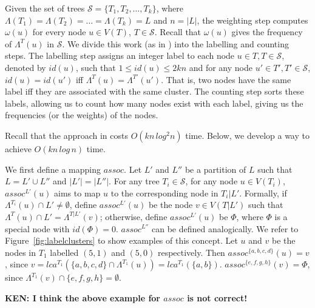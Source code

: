 \documentclass[final,1p,times]{elsarticle}
\newcommand{\leafset}{\Lambda}
\newcommand{\weight}{\omega}
\begin{document}
    Given the set of trees $\mathcal{S} = \{T_1, T_2, \ldots, T_k\}$, where $\leafset(T_1) = \leafset(T_2) = \ldots = \leafset(T_k) = L$ and $n = |L|$, the weighting step computes $\weight(u)$ for every node $u \in V(T)$, $T \in \mathcal{S}$. Recall that $\weight(u)$ gives the frequency of $\leafset^T(u)$ in $\mathcal{S}$. We divide this work (as in \cite{gawrychowski2017faster}) into the labelling and counting steps. The labelling step assigns an integer label to each node $u \in T, T \in \mathcal{S}$, denoted by $id(u)$, such that $1 \leq id(u) \leq 2kn$ and for any node $u' \in T', T' \in \mathcal{S}$, $id(u) = id(u')$ iff $\leafset^T(u) = \leafset^{T'}(u')$. That is, two nodes have the same label iff they are associated with the same cluster. The counting step sorts these labels, allowing us to count how many nodes exist with each label, giving us the frequencies (or the weights) of the nodes.

    Recall that the approach in \cite{gawrychowski2017faster} costs $O(kn\,log^2n)$ time. Below, we develop a way to achieve $O(kn\,log\,n)$ time.

    We first define a mapping $assoc$. Let $L'$ and $L''$ be a partition of $L$ such that $L = L' \cup L''$ and $|L'|=|L''|$.
    For any tree $T_i \in \mathcal{S}$, for any node $u \in V(T_i)$, $assoc^{L'}(u)$ aims to map $u$ to the corresponding node in $T_i|L'$. Formally, if $\Lambda^{T_i}(u) \cap L' \neq \emptyset$,
    define $assoc^{L'}(u)$ be the node $v \in V(T|L')$ such that $\Lambda^T(u) \cap L' = \Lambda^{T|L'}(v)$; otherwise, define $assoc^{L'}(u)$ be $\Phi$, where $\Phi$ is a special node with $id(\Phi) = 0$.
    $assoc^{L''}$ can be defined analogically.  We refer to Figure~\ref{fig:labelclusters} to show examples of this concept. Let $u$ and $v$ be the nodes in $T_1$ labelled $(5, 1)$ and $(5, 0)$ respectively. Then $assoc^{\{a, b, c, d\}}(u) = v$, since $v = lca^{T_1}(\{a, b, c, d\} \cap \leafset^{T_1}(u)) = lca^{T_1}(\{a, b\})$. $assoc^{\{e, f, g, h\}}(v) = \Phi$, since $\leafset^{T_1}(v) \cap \{e, f, g, h\} = \emptyset$.

    {\bf KEN: I think the above example for $assoc$ is not correct!}
\end{document}
